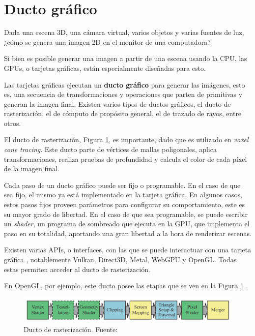 \section{Ducto gráfico}\label{sec:graphics-pipeline}

Dada una escena 3D, una cámara virtual, varios objetos y varias fuentes de luz, ¿cómo se genera una imagen 2D en el monitor de una computadora?

Si bien es posible generar una imagen a partir de una escena usando la CPU, las GPUs, o tarjetas gráficas, están especialmente diseñadas para esto.

Las tarjetas gráficas ejecutan un \textbf{ducto gráfico} para generar las imágenes, esto es, una secuencia de transformaciones y operaciones que parten de primitivas y generan la imagen final.
Existen varios tipos de ductos gráficos, el ducto de rasterización, el de cómputo de propósito general, el de trazado de rayos, entre otros.

El ducto de rasterización, Figura \ref{fig:raster-pipeline}, es importante, dado que es utilizado en \textit{voxel cone tracing}.
Este ducto parte de vértices de mallas poligonales, aplica transformaciones, realiza pruebas de profundidad y calcula el color de cada píxel de la imagen final.

Cada paso de un ducto gráfico puede ser fijo o programable.
En el caso de que sea fijo, el mismo ya está implementado en la tarjeta gráfica.
En algunos casos, estos pasos fijos proveen parámetros para configurar su comportamiento, este es su mayor grado de libertad.
En el caso de que sea programable, se puede escribir un \textit{shader}, un programa de sombreado que ejecuta en la GPU, que implementa el paso en su totalidad, aportando una gran libertad a la hora de renderizar escenas.

Existen varias APIs, o interfaces, con las que se puede interactuar con una tarjeta gráfica \cite{comparison-graphics-apis}, notablemente Vulkan, Direct3D, Metal, WebGPU y OpenGL.
Todas estas permiten acceder al ducto de rasterización.

En OpenGL, por ejemplo, este ducto posee las etapas que se ven en la Figura \ref{fig:raster-pipeline} \cite{rtr}.

\begin{figure}[h!]
    \centering
    \includegraphics[width=\textwidth]{raster-pipeline.png}
    \caption{Ducto de rasterización. Fuente: \cite{rtr}}
    \label{fig:raster-pipeline}
\end{figure}

